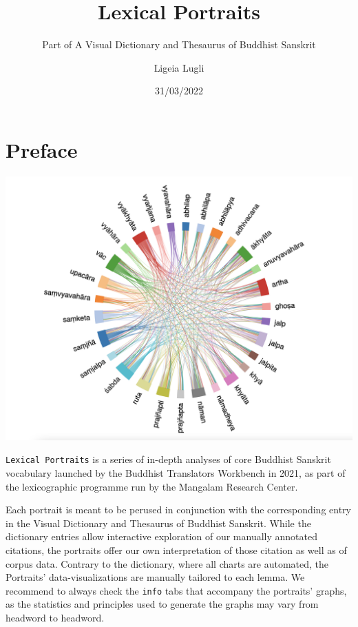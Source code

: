 \documentclass[
  letterpaper,
  DIV=11,
  numbers=noendperiod,
  oneside]{scrreprt}
\title{Lexical Portraits}
\subtitle{Part of A Visual Dictionary and Thesaurus of Buddhist
Sanskrit}
\author{Ligeia Lugli}
\date{31/03/2022}
\renewcommand*\contentsname{Table of contents}
\newcommand\contentsname{Table of contents}
\begin{document}
\maketitle
\ifdefined\Shaded\renewenvironment{Shaded}{\begin{tcolorbox}[frame hidden, interior hidden, borderline west={3pt}{0pt}{shadecolor}, enhanced, sharp corners, breakable, boxrule=0pt]}{\end{tcolorbox}}\fi

\renewcommand*\contentsname{Table of contents}
{
\hypersetup{linkcolor=}
\setcounter{tocdepth}{2}
\tableofcontents
}

\hypertarget{preface}{%
\chapter{Preface}\label{preface}}

\includegraphics{./SynchordLanguage.png}

\texttt{Lexical\ Portraits} is a series of in-depth analyses of core
Buddhist Sanskrit vocabulary launched by the Buddhist Translators
Workbench in 2021, as part of the lexicographic programme run by the
Mangalam Research Center.

Each portrait is meant to be perused in conjunction with the
corresponding entry in the Visual Dictionary and Thesaurus of Buddhist
Sanskrit. While the dictionary entries allow interactive exploration of
our manually annotated citations, the portraits offer our own
interpretation of those citation as well as of corpus data. Contrary to
the dictionary, where all charts are automated, the Portraits'
data-visualizations are manually tailored to each lemma. We recommend to
always check the \texttt{info} tabs that accompany the portraits'
graphs, as the statistics and principles used to generate the graphs may
vary from headword to headword.
\end{document}
